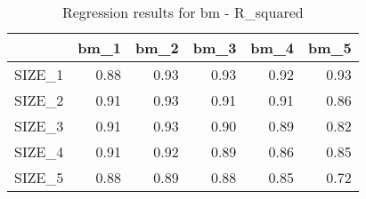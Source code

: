 \begin{table}[ht]
\centering
\caption{Regression results for bm - R_squared} 
\begin{tabular}{rrrrrr}
  \hline
 & bm\_1 & bm\_2 & bm\_3 & bm\_4 & bm\_5 \\ 
  \hline
SIZE\_1 & 0.88 & 0.93 & 0.93 & 0.92 & 0.93 \\ 
  SIZE\_2 & 0.91 & 0.93 & 0.91 & 0.91 & 0.86 \\ 
  SIZE\_3 & 0.91 & 0.93 & 0.90 & 0.89 & 0.82 \\ 
  SIZE\_4 & 0.91 & 0.92 & 0.89 & 0.86 & 0.85 \\ 
  SIZE\_5 & 0.88 & 0.89 & 0.88 & 0.85 & 0.72 \\ 
   \hline
\end{tabular}
\end{table}


